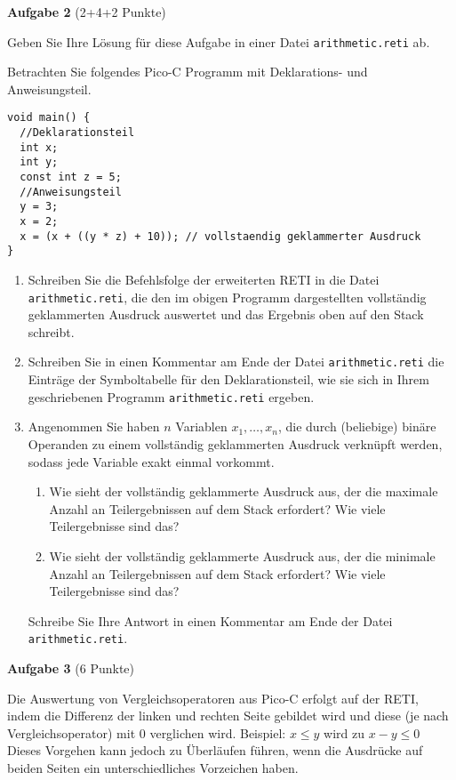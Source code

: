 \documentclass{article}
\begin{document}
\sloppy

\textbf{Aufgabe 2} (2+4+2 Punkte)

Geben Sie Ihre Lösung für diese Aufgabe in einer Datei \verb|arithmetic.reti| ab.

Betrachten Sie folgendes Pico-C Programm mit Deklarations- und Anweisungsteil.

\begin{verbatim}
void main() {
  //Deklarationsteil
  int x;
  int y;
  const int z = 5;
  //Anweisungsteil
  y = 3;
  x = 2;
  x = (x + ((y * z) + 10)); // vollstaendig geklammerter Ausdruck
}
\end{verbatim}

\begin{enumerate}
	\item Schreiben Sie die Befehlsfolge der erweiterten RETI in die Datei \verb|arithmetic.reti|, die den im obigen Programm dargestellten vollständig geklammerten Ausdruck auswertet und das Ergebnis oben auf den Stack schreibt. %
	\item Schreiben Sie in einen Kommentar am Ende der Datei \verb|arithmetic.reti| die Einträge der Symboltabelle für den Deklarationsteil, wie sie sich in Ihrem geschriebenen Programm \verb|arithmetic.reti| ergeben.
	\item Angenommen Sie haben $n$ Variablen $x_1, \ldots ,x_n$, die durch (beliebige) binäre Operanden zu einem vollständig geklammerten Ausdruck verknüpft werden, sodass jede Variable exakt einmal vorkommt.
	\begin{enumerate}
		\item Wie sieht der vollständig geklammerte Ausdruck aus, der die maximale Anzahl an Teilergebnissen auf dem Stack erfordert? Wie viele Teilergebnisse sind das?
		\item Wie sieht der vollständig geklammerte Ausdruck aus, der die minimale Anzahl an Teilergebnissen auf dem Stack erfordert? Wie viele Teilergebnisse sind das?
	\end{enumerate}
  Schreibe Sie Ihre Antwort in einen Kommentar am Ende der Datei \verb|arithmetic.reti|.
\end{enumerate}

\textbf{Aufgabe 3} (6 Punkte)

Die Auswertung von Vergleichsoperatoren aus Pico-C erfolgt auf der RETI, indem die Differenz der linken und rechten Seite gebildet wird und diese (je nach Vergleichsoperator) mit $0$ verglichen wird. Beispiel: $x \le y$ wird zu $x - y \le 0$ Dieses Vorgehen kann jedoch zu Überläufen führen, wenn die Ausdrücke auf beiden Seiten ein unterschiedliches Vorzeichen haben.
\end{document}
